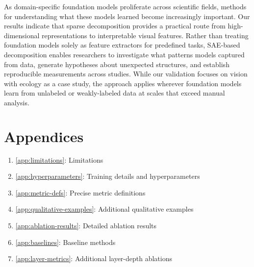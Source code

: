 \documentclass[runningheads]{llncs}
\begin{document}
As domain-specific foundation models proliferate across scientific fields, methods for understanding what these models learned become increasingly important. 
Our results indicate that sparse decomposition provides a practical route from high-dimensional representations to interpretable visual features. 
Rather than treating foundation models solely as feature extractors for predefined tasks, SAE-based decomposition enables researchers to investigate what patterns models captured from data, generate hypotheses about unexpected structures, and establish reproducible measurements across studies. 
While our validation focuses on vision with ecology as a case study, the approach applies wherever foundation models learn from unlabeled or weakly-labeled data at scales that exceed manual analysis.

\clearpage  %


%
%



\clearpage
\appendix

\setcounter{table}{0}
\renewcommand\thetable{\Alph{section}\arabic{table}}
\setcounter{figure}{0}
\renewcommand\thefigure{\Alph{section}\arabic{figure}}

\section*{Appendices}




\begin{enumerate}[nosep]
    \item{\cref{app:limitations}: Limitations}
    \item{\cref{app:hyperparameters}: Training details and hyperparameters}
    \item{\cref{app:metric-defs}: Precise metric definitions}
    \item{\cref{app:qualitative-examples}: Additional qualitative examples}
    \item{\cref{app:ablation-results}: Detailed ablation results}
    \item{\cref{app:baselines}: Baseline methods}
    \item{\cref{app:layer-metrics}: Additional layer-depth ablations}
\end{enumerate}
\end{document}
